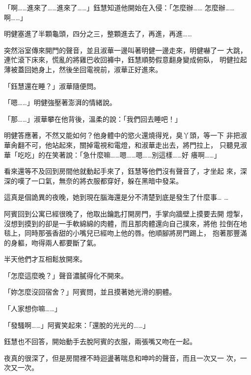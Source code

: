 「啊……進來了……進來了……」鈺慧知道他開始在入侵：「怎麼辦……
怎麼辦……啊……」

明健塞進了半顆龜頭，四分之三，整顆進去了，再進，再進……

突然浴室傳來開門的聲音，並且淑華一邊叫著明健一邊走來，明健嚇了一
大跳，連忙滾下床來，慌亂的將雞巴收回褲中，鈺慧順勢假意翻身變成俯臥，
明健拉起薄被蓋回她身上，然後坐回電視前，淑華正好進來。

「鈺慧還在睡？」淑華隨便問。

「嗯……」明健強壓著澎湃的情緒說。

「那……」淑華攀在他背後，溫柔的說：「我們回去睡吧！」

明健答應著，不然又能如何？他身體中的慾火還燒得兇，臭丫頭，等一下
非把淑華肏翻不可，他站起來，關掉電視和電燈，和淑華走出去，將門拉上，
只聽見淑華「吃吃」的在笑著說：「急什麼嘛……嗯……嗯……別這樣……好
癢啊……」

看來還等不及回到房間他就動起手來了，鈺慧等他們沒有聲音了，才坐起
來，深深的嘆了一口氣，無奈的將衣服都穿好，躲在黑暗中發呆。

這真是個詭異的夜晚，她到現在腦海還是分不清楚到底是發生了什麼事…
…

阿賓回到公寓已經很晚了，他取出鑰匙打開房門，手掌向牆壁上摸要去開
燈掣，沒想到摸到的卻是一手軟綿綿的肉體，而且那肉體還向自己撲來，將他
拉倒在地毯上，同時那張香甜的小嘴兒已經吻上他的唇。他順腳將房門踢上，
抱著那豐滿的身軀，吻得兩人都要斷了氣。

半天他們才互相鬆放開來。

「怎麼這麼晚？」聲音濃膩得化不開來。

「妳怎麼沒回宿舍？」阿賓問，並且摸著她光滑的胴體。

「人家想你嘛……」

「發騷啊……」阿賓笑起來：「還脫的光光的……」

鈺慧也不回答，開始動手去脫阿賓的衣服，兩張嘴又吻在一起。

夜真的很深了，但是房間裡不時迴盪著喘息和呻吟的聲音，而且一次又一
次，一次又一次。










